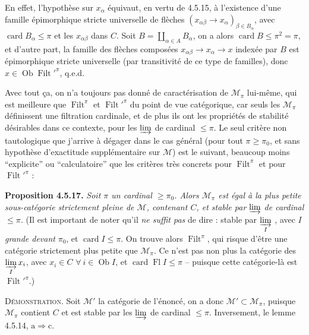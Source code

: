 \documentclass[11pt]{article}
\newcommand{\printedpage}[1]{\marginpar{\footnotesize p.~#1}}
\newcommand{\msp}[1]{\marginpar{\footnotesize [#1]}}
\newcommand{\Filt}{\operatorname{Filt}}
\newcommand{\card}{\operatorname{card}}
\newcommand{\Fl}{\operatorname{Fl}}
\newcommand{\Ob}{\operatorname{Ob}}
\begin{document}
En effet, l'hypothèse sur $x_{\alpha}$ équivaut, en vertu de 4.5.15, à l'existence d'une famille épimorphique stricte universelle de flèches $(x_{\alpha\beta} \longrightarrow x_{\alpha})_{\beta\in B_{\alpha}}$, avec $\card B_{\alpha} \leqslant \pi$ et les $x_{\alpha\beta}$ dans $C$. Soit $B = \coprod_{\alpha\in A} B_{\alpha}$, on a alors $\card B \leqslant \pi^2 = \pi$, et d'autre part, la famille des flèches composées $x_{\alpha\beta} \longrightarrow x_{\alpha} \longrightarrow x$ indexée par $B$ est épimorphique stricte universelle (par transitivité de ce type de familles), donc $x \in \Ob \Filt'^{\pi}$, q.e.d.

Avec tout ça, on n'a toujours pas donné de caractérisation de $\mathcal{M}_{\pi}$ lui-même, qui est meilleure que $\Filt^{\pi}$ et $\Filt'^{\pi}$ du point de vue catégorique, car seuls les $\mathcal{M}_{\pi}$ définissent une filtration cardinale, et de plus ils ont les propriétés de stabilité désirables dans ce
\msp{page 138}
contexte, pour les $\varinjlim$ de cardinal $\leqslant \pi$. Le seul critère non tautologique que j'arrive à dégager dans le cas général (pour tout $\pi \geqslant \pi_0$, et sans hypothèse d'exactitude supplémentaire sur $\mathcal{M}$) est le suivant, beaucoup moins ``explicite'' ou ``calculatoire'' que les critères très concrets pour $\Filt^{\pi}$ et pour $\Filt'^{\pi}$ :

\textbf{Proposition 4.5.17.} \textit{Soit $\pi$ un cardinal $\geqslant \pi_0$. Alors $\mathcal{M}_{\pi}$ est égal à la plus petite sous-catégorie strictement pleine de $\mathcal{M}$, contenant $C$, et stable par} $\varinjlim$ \textit{de cardinal $\leqslant \pi$.} (Il est important de noter qu'il \textit{ne suffit pas} de dire : stable par $\varinjlim\limits_{I}$ , avec \textit{$I$ grande devant} $\pi_0$, et $\card I \leqslant \pi$. On trouve alors $\Filt^{\pi}$, qui risque d'être une catégorie strictement plus petite que $\mathcal{M}_{\pi}$. Ce n'est pas non plus la catégorie des $\varinjlim\limits_{I} x_i$, avec $x_i \in C$ $\forall\ i \in \Ob I$, et $\card \Fl I \leqslant \pi$ -- puisque cette catégorie-là est $\Filt'^{\pi}$.)

\textsc{Démonstration}. Soit $\mathcal{M}'$ la catégorie de l'énoncé, on a donc $\mathcal{M}' \subset \mathcal{M}_{\pi}$, puisque $\mathcal{M}_{\pi}$ contient $C$ et est stable par les $\varinjlim$ de cardinal $\leqslant \pi$. Inversement, le lemme 4.5.14, $\mathrm{a} \Longrightarrow \mathrm{c}$.

\printedpage{44}
\end{document}
